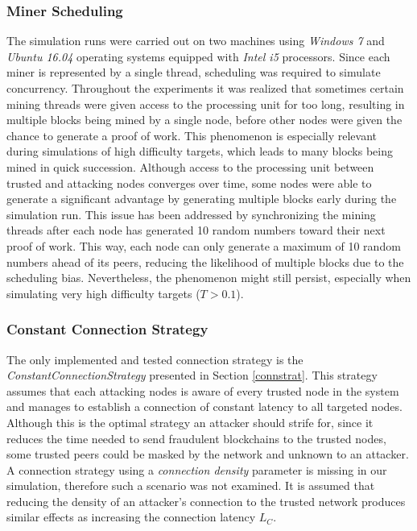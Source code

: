 \documentclass[a4paper,12pt,twoside]{report}
\begin{document}
\subsubsection{Miner Scheduling}
The simulation runs were carried out on two machines using \textit{Windows 7} and \textit{Ubuntu 16.04} operating systems equipped with \textit{Intel i5} processors. Since each miner is represented by a single thread, scheduling was required to simulate concurrency. Throughout the experiments it was realized that sometimes certain mining threads were given access to the processing unit for too long, resulting in multiple blocks being mined by a single node, before other nodes were given the chance to generate a proof of work. This phenomenon is especially relevant during simulations of high difficulty targets, which leads to many blocks being mined in quick succession. Although access to the processing unit between trusted and attacking nodes converges over time, some nodes were able to generate a significant advantage by generating multiple blocks early during the simulation run. This issue has been addressed by synchronizing the mining threads after each node has generated 10 random numbers toward their next proof of work. This way, each node can only generate a maximum of 10 random numbers ahead of its peers, reducing the likelihood of multiple blocks due to the scheduling bias. Nevertheless, the phenomenon might still persist, especially when simulating very high difficulty targets ($T > 0.1$).
\subsubsection{Constant Connection Strategy}
The only implemented and tested connection strategy is the \textit{ConstantConnectionStrategy} presented in Section \ref{connstrat}. This strategy assumes that each attacking nodes is aware of every trusted node in the system and manages to establish a connection of constant latency to all targeted nodes. Although this is the optimal strategy an attacker should strife for, since it reduces the time needed to send fraudulent blockchains to the trusted nodes, some trusted peers could be masked by the network and unknown to an attacker. A connection strategy using a \textit{connection density} parameter is missing in our simulation, therefore such a scenario was not examined. It is assumed that reducing the density of an attacker's connection to the trusted network produces similar effects as increasing the connection latency $L_C$.
\end{document}
